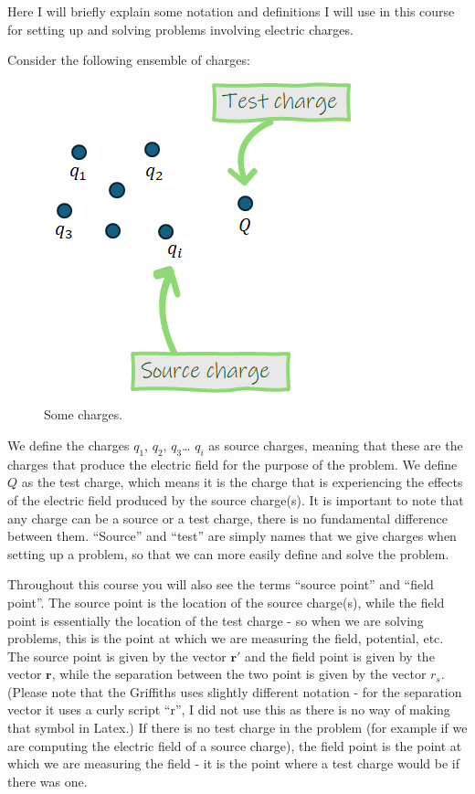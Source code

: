 \documentclass[
  letterpaper,
  DIV=11,
  numbers=noendperiod]{scrreprt}
\begin{document}
Here I will briefly explain some notation and definitions I will use in
this course for setting up and solving problems involving electric
charges.

Consider the following ensemble of charges:

\begin{figure}[H]

{\centering \includegraphics{Figures/sourcetest_definitions.png}

}

\caption{Some charges.}

\end{figure}%

We define the charges \(q_1\), \(q_2\), \(q_3\)\ldots{} \(q_i\) as
source charges, meaning that these are the charges that produce the
electric field for the purpose of the problem. We define \(Q\) as the
test charge, which means it is the charge that is experiencing the
effects of the electric field produced by the source charge(s). It is
important to note that any charge can be a source or a test charge,
there is no fundamental difference between them. ``Source'' and ``test''
are simply names that we give charges when setting up a problem, so that
we can more easily define and solve the problem.

Throughout this course you will also see the terms ``source point'' and
``field point''. The source point is the location of the source
charge(s), while the field point is essentially the location of the test
charge - so when we are solving problems, this is the point at which we
are measuring the field, potential, etc. The source point is given by
the vector \(\mathrm{\mathbf{r}}'\) and the field point is given by the
vector \(\mathrm{\mathbf{r}}\), while the separation between the two
point is given by the vector \(r_s\). (Please note that the Griffiths
uses slightly different notation - for the separation vector it uses a
curly script ``r'', I did not use this as there is no way of making that
symbol in Latex.) If there is no test charge in the problem (for example
if we are computing the electric field of a source charge), the field
point is the point at which we are measuring the field - it is the point
where a test charge would be if there was one.
\end{document}
